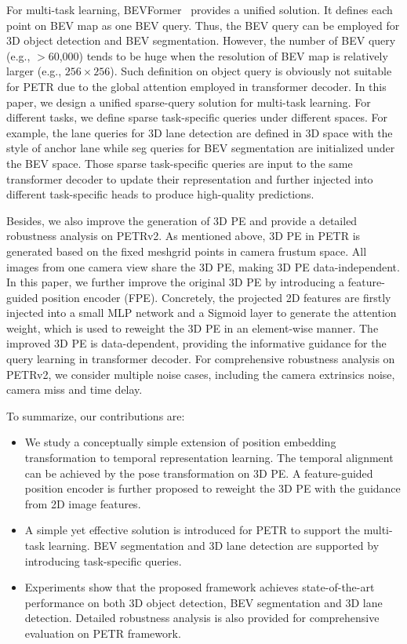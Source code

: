 \documentclass[10pt,twocolumn,letterpaper]{article}
\begin{document}
For multi-task learning, BEVFormer~\cite{li2022bevformer} provides a unified solution. It defines each point on BEV map as one BEV query. Thus, the BEV query can be employed for 3D object detection and BEV segmentation. However, the number of BEV query (e.g., $>$60,000) tends to be huge when the resolution of BEV map is relatively larger (e.g., $256 \times 256$). Such definition on object query is obviously not suitable for PETR due to the global attention employed in transformer decoder. In this paper, we design a unified sparse-query solution for multi-task learning. For different tasks, we define  sparse task-specific queries under different spaces. For example, the lane queries for 3D lane detection are defined in 3D space with the style of anchor lane while seg queries for BEV segmentation are initialized under the BEV space. Those sparse task-specific queries are input to the same transformer decoder to update their representation and further injected into different task-specific heads to produce high-quality predictions.

Besides, we also improve the generation of 3D PE and provide a detailed robustness analysis on PETRv2. As mentioned above, 3D PE in PETR is generated based on the fixed meshgrid points in camera frustum space. All images from one camera view share the 3D PE, making 3D PE data-independent. In this paper, we further improve the original 3D PE by introducing a feature-guided position encoder (FPE). Concretely, the projected 2D features are firstly injected into a small MLP network and a Sigmoid layer to generate the attention weight, which is used to reweight the 3D PE in an element-wise manner. The improved 3D PE is data-dependent, providing the informative guidance for the query learning in transformer decoder. 
For comprehensive robustness analysis on PETRv2, we consider multiple noise cases, including the camera extrinsics noise, camera miss and time delay. 

To summarize, our contributions are:
\begin{itemize}
\item We study a conceptually simple extension of position embedding transformation to temporal representation learning. The temporal alignment can be achieved by the pose transformation on 3D PE. A feature-guided position encoder is further proposed to reweight the 3D PE with the guidance from 2D image features.
\item A simple yet effective solution is introduced for PETR to support the multi-task learning. BEV segmentation and 3D lane detection are supported by introducing task-specific queries.
\item Experiments show that the proposed framework achieves state-of-the-art performance on both 3D object detection, BEV segmentation and 3D lane detection. Detailed robustness analysis is also provided for comprehensive evaluation on PETR framework.
\end{itemize}
\end{document}

